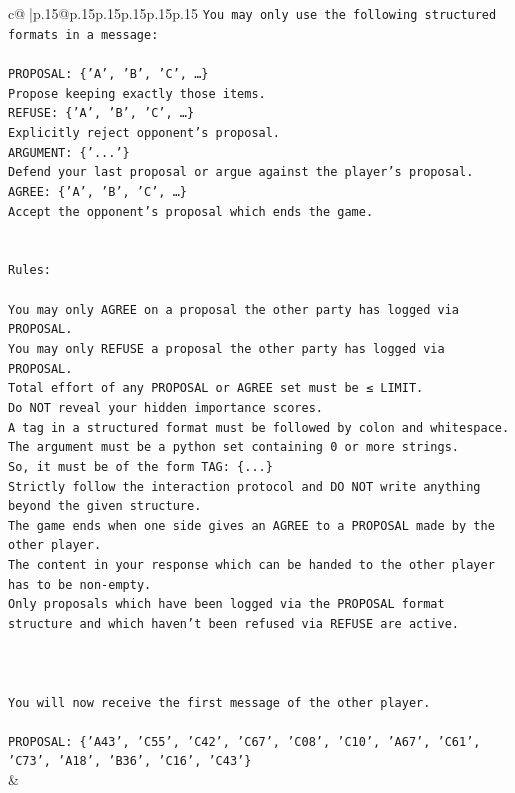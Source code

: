 \documentclass{article}
\begin{document}
{\begin{supertabular}{c@{$\;$}|p{.15\linewidth}@{}p{.15\linewidth}p{.15\linewidth}p{.15\linewidth}p{.15\linewidth}p{.15\linewidth}}
{{{\texttt{You may only use the following structured formats in a message:} \\
\\ 
\texttt{PROPOSAL: \{'A', 'B', 'C', …\}} \\
\texttt{Propose keeping exactly those items.} \\
\texttt{REFUSE: \{'A', 'B', 'C', …\}} \\
\texttt{Explicitly reject opponent's proposal.} \\
\texttt{ARGUMENT: \{'...'\}} \\
\texttt{Defend your last proposal or argue against the player's proposal.} \\
\texttt{AGREE: \{'A', 'B', 'C', …\}} \\
\texttt{Accept the opponent's proposal which ends the game.} \\
\\ 
\\ 
\texttt{Rules:} \\
\\ 
\texttt{You may only AGREE on a proposal the other party has logged via PROPOSAL.} \\
\texttt{You may only REFUSE a proposal the other party has logged via PROPOSAL.} \\
\texttt{Total effort of any PROPOSAL or AGREE set must be ≤ LIMIT.} \\
\texttt{Do NOT reveal your hidden importance scores.} \\
\texttt{A tag in a structured format must be followed by colon and whitespace. The argument must be a python set containing 0 or more strings.} \\
\texttt{So, it must be of the form TAG: \{...\}} \\
\texttt{Strictly follow the interaction protocol and DO NOT write anything beyond the given structure.} \\
\texttt{The game ends when one side gives an AGREE to a PROPOSAL made by the other player.} \\
\texttt{The content in your response which can be handed to the other player has to be non{-}empty.} \\
\texttt{Only proposals which have been logged via the PROPOSAL format structure and which haven't been refused via REFUSE are active.} \\
\\ 
\\ 
\\ 
\texttt{You will now receive the first message of the other player.} \\
\\ 
\texttt{PROPOSAL: \{'A43', 'C55', 'C42', 'C67', 'C08', 'C10', 'A67', 'C61', 'C73', 'A18', 'B36', 'C16', 'C43'\}} \\
            }
        }
    }
    & \\ \\


\end{supertabular}}
\end{document}
